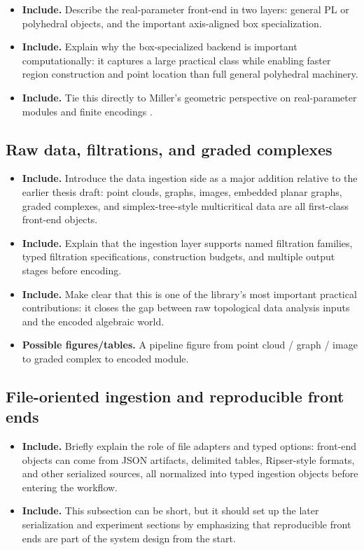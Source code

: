 \documentclass[11pt]{article}
\newenvironment{plan}{\begin{itemize}[leftmargin=1.6em,itemsep=0.35em,topsep=0.25em]}{\end{itemize}}
\newcommand{\includeitems}[1]{\item \textbf{Include.} #1}
\newcommand{\figures}[1]{\item \textbf{Possible figures/tables.} #1}
\begin{document}
\begin{plan}
    \includeitems{Describe the real-parameter front-end in two layers: general PL or polyhedral objects, and the important axis-aligned box specialization.}
    \includeitems{Explain why the box-specialized backend is important computationally: it captures a large practical class while enabling faster region construction and point location than full general polyhedral machinery.}
    \includeitems{Tie this directly to Miller's geometric perspective on real-parameter modules and finite encodings \cite{Mil20,Mil23,KS18}.}
\end{plan}

\subsection{Raw data, filtrations, and graded complexes}

\begin{plan}
    \includeitems{Introduce the data ingestion side as a major addition relative to the earlier thesis draft: point clouds, graphs, images, embedded planar graphs, graded complexes, and simplex-tree-style multicritical data are all first-class front-end objects.}
    \includeitems{Explain that the ingestion layer supports named filtration families, typed filtration specifications, construction budgets, and multiple output stages before encoding.}
    \includeitems{Make clear that this is one of the library's most important practical contributions: it closes the gap between raw topological data analysis inputs and the encoded algebraic world.}
    \figures{A pipeline figure from point cloud / graph / image to graded complex to encoded module.}
\end{plan}

\subsection{File-oriented ingestion and reproducible front ends}

\begin{plan}
    \includeitems{Briefly explain the role of file adapters and typed options: front-end objects can come from JSON artifacts, delimited tables, Ripser-style formats, and other serialized sources, all normalized into typed ingestion objects before entering the workflow.}
    \includeitems{This subsection can be short, but it should set up the later serialization and experiment sections by emphasizing that reproducible front ends are part of the system design from the start.}
\end{plan}
\end{document}
